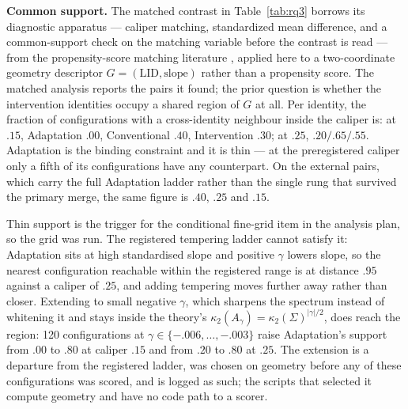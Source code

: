 \documentclass[pdflatex,sn-basic]{sn-jnl}
\theoremstyle{plain}
\theoremstyle{definition}
\theoremstyle{remark}
\begin{document}
\textbf{Common support.} The matched contrast in Table~\ref{tab:rq3} borrows its
diagnostic apparatus --- caliper matching, standardized mean difference, and a
common-support check on the matching variable before the contrast is read ---
from the propensity-score matching literature \citep{austin2011introduction}, applied here to a
two-coordinate geometry descriptor $G=(\mathrm{LID},\mathrm{slope})$ rather than
a propensity score. The matched analysis reports the pairs it found; the
prior question is whether the intervention identities occupy a shared region of
$G$ at all. Per identity, the fraction of configurations with a cross-identity
neighbour inside the caliper is: at $.15$, Adaptation $.00$, Conventional $.40$,
Intervention $.30$; at $.25$, $.20/.65/.55$. Adaptation is the binding
constraint and it is thin --- at the preregistered caliper only a fifth of its
configurations have any counterpart. On the external pairs, which carry the full
Adaptation ladder rather than the single rung that survived the primary merge,
the same figure is $.40$, $.25$ and $.15$.

Thin support is the trigger for the conditional fine-grid item in the analysis
plan, so the grid was run. The registered tempering ladder cannot satisfy it:
Adaptation sits at high standardised slope and positive $\gamma$ lowers slope,
so the nearest configuration reachable within the registered range is at
distance $.95$ against a caliper of $.25$, and adding tempering moves further
away rather than closer. Extending to small negative $\gamma$, which sharpens
the spectrum instead of whitening it and stays inside the theory's
$\kappa_2(A_\gamma)=\kappa_2(\Sigma)^{|\gamma|/2}$, does reach the region: 120
configurations at $\gamma\in\{-.006,\dots,-.003\}$ raise Adaptation's support
from $.00$ to $.80$ at caliper $.15$ and from $.20$ to $.80$ at $.25$. The
extension is a departure from the registered ladder, was chosen on geometry
before any of these configurations was scored, and is logged as such; the
scripts that selected it compute geometry and have no code path to a scorer.
\end{document}

